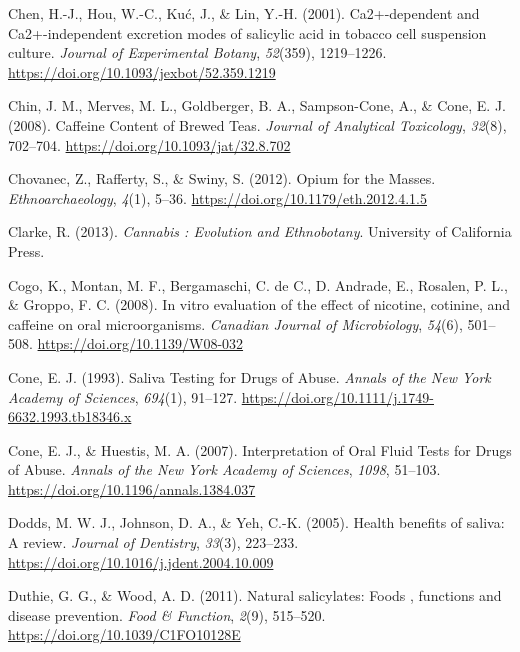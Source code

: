 \documentclass[
  b5paper,
]{book}
\newlength{\cslhangindent}
\newenvironment{CSLReferences}[2] %
 {\begin{list}{}{%
  \setlength{\itemindent}{0pt}
  \setlength{\leftmargin}{0pt}
  \setlength{\parsep}{0pt}
  \ifodd #1
   \setlength{\leftmargin}{\cslhangindent}
   \setlength{\itemindent}{-1\cslhangindent}
  \fi
  \setlength{\itemsep}{#2\baselineskip}}}
 {\end{list}}
\begin{document}
\begin{CSLReferences}{1}{0}
Chen, H.-J., Hou, W.-C., Kuć, J., \& Lin, Y.-H. (2001). Ca2+-dependent
and {Ca2}+-independent excretion modes of salicylic acid in tobacco cell
suspension culture. \emph{Journal of Experimental Botany},
\emph{52}(359), 1219--1226.
\url{https://doi.org/10.1093/jexbot/52.359.1219}

Chin, J. M., Merves, M. L., Goldberger, B. A., Sampson-Cone, A., \&
Cone, E. J. (2008). Caffeine {Content} of {Brewed Teas}. \emph{Journal
of Analytical Toxicology}, \emph{32}(8), 702--704.
\url{https://doi.org/10.1093/jat/32.8.702}

Chovanec, Z., Rafferty, S., \& Swiny, S. (2012). Opium for the {Masses}.
\emph{Ethnoarchaeology}, \emph{4}(1), 5--36.
\url{https://doi.org/10.1179/eth.2012.4.1.5}

Clarke, R. (2013). \emph{Cannabis : {Evolution} and {Ethnobotany}}.
{University of California Press}.

Cogo, K., Montan, M. F., Bergamaschi, C. de C., D. Andrade, E., Rosalen,
P. L., \& Groppo, F. C. (2008). In vitro evaluation of the effect of
nicotine, cotinine, and caffeine on oral microorganisms. \emph{Canadian
Journal of Microbiology}, \emph{54}(6), 501--508.
\url{https://doi.org/10.1139/W08-032}

Cone, E. J. (1993). Saliva {Testing} for {Drugs} of {Abuse}.
\emph{Annals of the New York Academy of Sciences}, \emph{694}(1),
91--127. \url{https://doi.org/10.1111/j.1749-6632.1993.tb18346.x}

Cone, E. J., \& Huestis, M. A. (2007). Interpretation of {Oral Fluid
Tests} for {Drugs} of {Abuse}. \emph{Annals of the New York Academy of
Sciences}, \emph{1098}, 51--103.
\url{https://doi.org/10.1196/annals.1384.037}

Dodds, M. W. J., Johnson, D. A., \& Yeh, C.-K. (2005). Health benefits
of saliva: A review. \emph{Journal of Dentistry}, \emph{33}(3),
223--233. \url{https://doi.org/10.1016/j.jdent.2004.10.009}

Duthie, G. G., \& Wood, A. D. (2011). Natural salicylates: Foods ,
functions and disease prevention. \emph{Food \& Function}, \emph{2}(9),
515--520. \url{https://doi.org/10.1039/C1FO10128E}


\end{CSLReferences}
\end{document}
